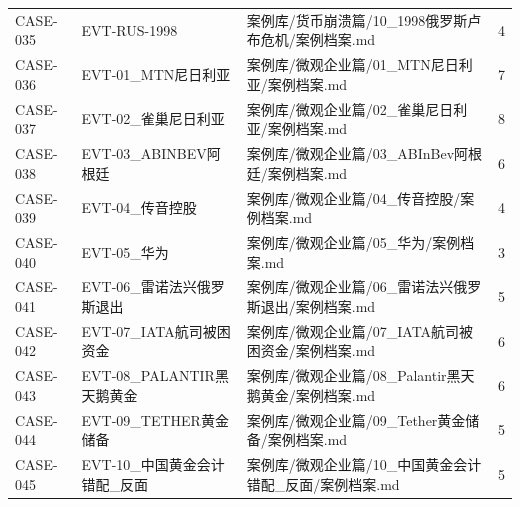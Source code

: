 \documentclass[UTF8,openany,oneside,11pt]{ctexbook}
\begin{document}
\begin{longtable}{L{1.5cm}L{3cm}L{10cm}r}
CASE-035 & EVT-RUS-1998 & 案例库/货币崩溃篇/10\_1998俄罗斯卢布危机/案例档案.md & 4 \\
CASE-036 & EVT-01\_MTN尼日利亚 & 案例库/微观企业篇/01\_MTN尼日利亚/案例档案.md & 7 \\
CASE-037 & EVT-02\_雀巢尼日利亚 & 案例库/微观企业篇/02\_雀巢尼日利亚/案例档案.md & 8 \\
CASE-038 & EVT-03\_ABINBEV阿根廷 & 案例库/微观企业篇/03\_ABInBev阿根廷/案例档案.md & 6 \\
CASE-039 & EVT-04\_传音控股 & 案例库/微观企业篇/04\_传音控股/案例档案.md & 4 \\
CASE-040 & EVT-05\_华为 & 案例库/微观企业篇/05\_华为/案例档案.md & 3 \\
CASE-041 & EVT-06\_雷诺法兴俄罗斯退出 & 案例库/微观企业篇/06\_雷诺法兴俄罗斯退出/案例档案.md & 5 \\
CASE-042 & EVT-07\_IATA航司被困资金 & 案例库/微观企业篇/07\_IATA航司被困资金/案例档案.md & 6 \\
CASE-043 & EVT-08\_PALANTIR黑天鹅黄金 & 案例库/微观企业篇/08\_Palantir黑天鹅黄金/案例档案.md & 6 \\
CASE-044 & EVT-09\_TETHER黄金储备 & 案例库/微观企业篇/09\_Tether黄金储备/案例档案.md & 5 \\
CASE-045 & EVT-10\_中国黄金会计错配\_反面 & 案例库/微观企业篇/10\_中国黄金会计错配\_反面/案例档案.md & 5 \\
\bottomrule\end{longtable}\normalsize
\end{document}
